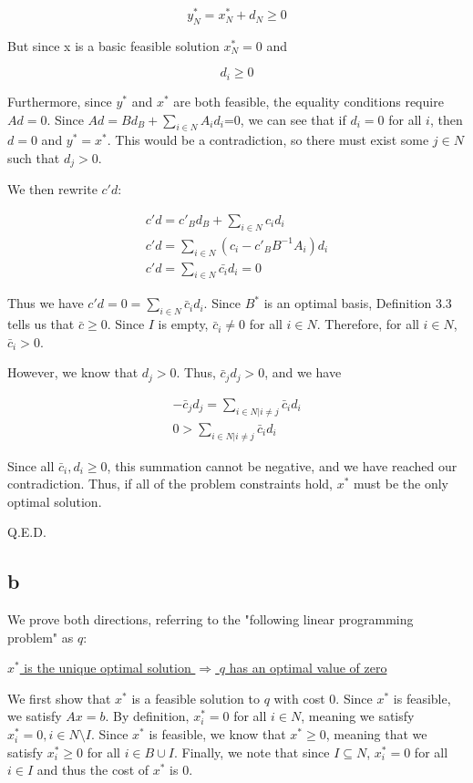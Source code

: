 \documentclass[11pt,a4paper]{article}
\begin{document}
$$
y^*_N = x^*_N+d_N\geq 0
$$

But since x is a basic feasible solution $x_N^*=0$ and

$$
d_i\geq 0
$$

Furthermore, since $y^*$ and $x^*$ are both feasible, the equality conditions require $Ad=0$. Since $Ad=Bd_B+\sum_{i\in N}A_id_i$=0, we can see that if $d_i=0$ for all $i$, then $d=0$ and $y^*=x^*$. This would be a contradiction, so there must exist some $j\in N$ such that $d_j>0$. 

We then rewrite $c'd$:

\begin{equation}
\begin{split}
c'd=c'_Bd_B + \sum_{i\in N}c_id_i\\
c'd=\sum_{i\in N}(c_i-c'_BB^{-1}A_i)d_i\\
c'd=\sum_{i\in N}\bar{c_i}d_i=0
\end{split}
\end{equation}

Thus we have $c'd=0=\sum_{i\in N}\bar{c}_id_i$. Since $B^*$ is an optimal basis, Definition 3.3 tells us that $\bar{c}\geq 0$. Since $I$ is empty, $\bar{c}_i\neq 0$ for all $i\in N$. Therefore, for all $i\in N$, $\bar{c}_i>0$. 

However, we know that $d_j>0$. Thus, $\bar{c}_jd_j>0$, and we have

\begin{equation}
\begin{split}
-\bar{c}_jd_j=\sum_{i\in N|i\neq j}\bar{c}_id_i\\
0>\sum_{i\in N|i\neq j}\bar{c}_id_i
\end{split}
\end{equation}

Since all $\bar{c}_i, d_i\geq0$, this summation cannot be negative, and we have reached our contradiction. Thus, if all of the problem constraints hold, $x^*$ must be the only optimal solution.

Q.E.D.

\subsection{b}

We prove both directions, referring to the "following linear programming problem" as $q$:

\underline{$x^*$ is the unique optimal solution $\Rightarrow$ $q$ has an optimal value of zero}

We first show that $x^*$ is a feasible solution to $q$ with cost $0$. Since $x^*$ is feasible, we satisfy $Ax=b$. By definition, $x^*_i=0$ for all $i\in N$, meaning we satisfy $x^*_i=0, i\in N\texttt{\textbackslash} I$. Since $x^*$ is feasible, we know that $x^*\geq 0$, meaning that we satisfy $x^*_i\geq 0$ for all $i\in B\cup I$. Finally, we note that since $I\subseteq N$, $x^*_i=0$ for all $i\in I$ and thus the cost of $x^*$ is 0. 
\end{document}
